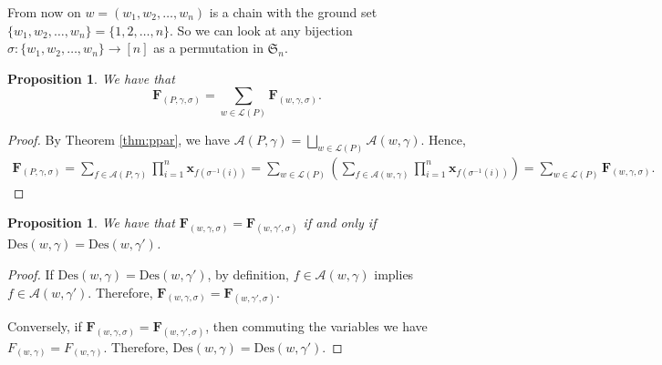 \documentclass[11pt]{amsart}
\newtheorem{Proposition}[Theorem]{Proposition}
\numberwithin{equation}{section}
\newcommand{\Des}{\mathrm{Des}}
\newcommand{\bfF}{{\mathbf{F}}}
\newcommand{\frakS}{{\mathfrak{S}}}
\begin{document}
From now on  $w=(w_1,w_2,\dots,w_n)$ is a chain with the ground set $\{w_1,w_2, \dots, w_n\}=\{1,2,\dots,n\}$. So we can look at any bijection  $\sigma: \{w_1,w_2, \dots, w_n\} \rightarrow [n]$ as a permutation in $\frakS_n$. 



\begin{Proposition}\label{prop:fund1} We have that
	$$\mathbf{F}_{(P,\gamma,\sigma)}=\sum_{w\in\mathcal{L}(P)}\mathbf{F}_{(w,\gamma,\sigma)}.$$
\end{Proposition}

\begin{proof}
	By Theorem \ref{thm:ppar}, we have $\mathcal{A}(P,\gamma)=\bigsqcup_{w\in\mathcal{L}(P)}\mathcal{A}(w,\gamma)$. Hence,
	\begin{align*}
		\mathbf{F}_{(P,\gamma,\sigma)}=\sum_{f\in\mathcal{A}(P,\gamma)}\prod_{i=1}^{n}\mathbf{x}_{f(\sigma^{-1}(i))}=\sum_{w\in\mathcal{L}(P)}\left(\sum_{f\in\mathcal{A}(w,\gamma)}\prod_{i=1}^n\mathbf{x}_{f(\sigma^{-1}(i))}\right)=\sum_{w\in\mathcal{L}(P)}\mathbf{F}_{(w,\gamma,\sigma)}.
	\end{align*}
\end{proof}

\begin{Proposition}\label{prop:fund-eq}
	We have that $\mathbf{F}_{(w,\gamma,\sigma)}=\mathbf{F}_{(w,\gamma',\sigma)}$ if and only if $\Des(w,\gamma)=\Des(w,\gamma')$.
\end{Proposition}

\begin{proof}
	If $\Des(w,\gamma)=\Des(w,\gamma')$, by definition, $f\in\mathcal{A}(w,\gamma)$ implies $f\in\mathcal{A}(w,\gamma')$. Therefore, $\mathbf{F}_{(w,\gamma,\sigma)}=\mathbf{F}_{(w,\gamma',\sigma)}$.
	
	Conversely, if $\bfF_{(w,\gamma,\sigma)}=\bfF_{(w,\gamma',\sigma)}$, then commuting the variables we have $F_{(w,\gamma)}=F_{(w,\gamma)}$. Therefore, $\Des(w,\gamma)=\Des(w,\gamma')$.
\end{proof}
\end{document}
